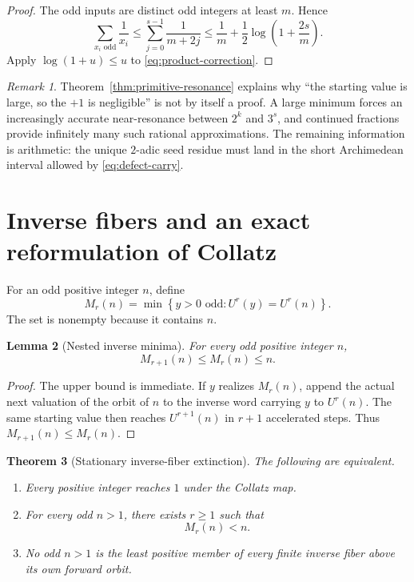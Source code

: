 \documentclass[11pt,reqno]{amsart}
\numberwithin{equation}{section}
\newtheorem{theorem}{Theorem}[section]
\newtheorem{lemma}[theorem]{Lemma}
\theoremstyle{definition}
\theoremstyle{remark}
\newtheorem{remark}[theorem]{Remark}
\newcommand{\set}[1]{\left\{#1\right\}}
\begin{document}
\begin{proof}
The odd inputs are distinct odd integers at least $m$.  Hence
\[
\sum_{x_i\text{ odd}}\frac1{x_i}
\le
\sum_{j=0}^{s-1}\frac1{m+2j}
\le
\frac1m+\frac12\log\left(1+\frac{2s}{m}\right).
\]
Apply $\log(1+u)\le u$ to \eqref{eq:product-correction}.
\end{proof}

\begin{remark}
Theorem~\ref{thm:primitive-resonance} explains why ``the starting value is
large, so the $+1$ is negligible'' is not by itself a proof.  A large
minimum forces an increasingly accurate near-resonance between $2^k$ and
$3^s$, and continued fractions provide infinitely many such rational
approximations.  The remaining information is arithmetic: the unique
$2$-adic seed residue must land in the short Archimedean interval allowed by
\eqref{eq:defect-carry}.
\end{remark}

\section{Inverse fibers and an exact reformulation of Collatz}\label{sec:fibers}

For an odd positive integer $n$, define
\begin{equation}\label{eq:Mr-def}
M_r(n)=
\min\set{y>0\text{ odd}:U^r(y)=U^r(n)}.
\end{equation}
The set is nonempty because it contains $n$.

\begin{lemma}[Nested inverse minima]\label{lem:nested-minima}
For every odd positive integer $n$,
\begin{equation}\label{eq:Mr-monotone}
M_{r+1}(n)\le M_r(n)\le n.
\end{equation}
\end{lemma}

\begin{proof}
The upper bound is immediate.  If $y$ realizes $M_r(n)$, append the actual
next valuation of the orbit of $n$ to the inverse word carrying $y$ to
$U^r(n)$.  The same starting value then reaches $U^{r+1}(n)$ in $r+1$
accelerated steps.  Thus $M_{r+1}(n)\le M_r(n)$.
\end{proof}

\begin{theorem}[Stationary inverse-fiber extinction]\label{thm:SFE-equivalence}
The following are equivalent.
\begin{enumerate}[label=(\roman*),leftmargin=2.3em]
\item Every positive integer reaches $1$ under the Collatz map.
\item For every odd $n>1$, there exists $r\ge1$ such that
      \begin{equation}\label{eq:SFE}
      M_r(n)<n.
      \end{equation}
\item No odd $n>1$ is the least positive member of every finite inverse fiber
      above its own forward orbit.
\end{enumerate}
\end{theorem}
\end{document}
